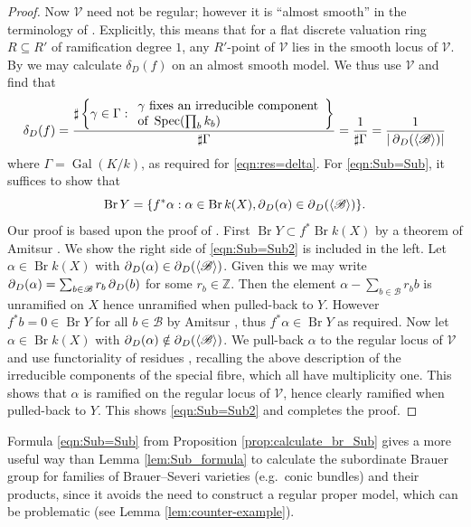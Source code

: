 \documentclass[a4paper,12pt,reqno]{amsart}
\numberwithin{equation}{section} \numberwithin{figure}{section}
\DeclareMathOperator{\Gal}{Gal} \DeclareMathOperator{\NS}{NS}
\DeclareMathOperator{\Spec}{Spec}
\DeclareMathOperator{\Br}{Br} \DeclareMathOperator{\Brnr}{Br_{nr}}
\newcommand\Z{\mathbb{Z}}
\newcommand{\br}{\mathscr{B}}
\renewcommand{\#}{\sharp}
\theoremstyle{definition}
\numberwithin{lemma}{section}
\begin{document}
\begin{proof}
Now $\mathcal{V}$ need not be regular; however it is ``almost smooth'' in the terminology of \cite[Def.~2.1]{Lou18}. Explicitly, this means that for a flat discrete valuation ring $R \subseteq R'$ of ramification degree $1$, any $R'$-point of $\mathcal{V}$ lies in the smooth locus of $\mathcal{V}$. By \cite[Lem.~3.11]{LS16} we may calculate $\delta_D(f)$ on an almost smooth model. We thus use  $\mathcal{V}$ and find that
$$\delta_D(f) = \frac{\# \left\{ \gamma \in \Gamma : 
	\begin{array}{l}
		\gamma \text{ fixes an irreducible component} \\
		\text{of } \Spec(\prod_b k_b)
	\end{array}
	\right \}}
	{\# \Gamma } = \frac{1}{\# \Gamma} = \frac{1}{|\res_D(\langle\br\rangle)|}$$
where $\Gamma = \Gal(K/k)$, as required for \eqref{eqn:res=delta}. For \eqref{eqn:Sub=Sub}, it suffices to show that
\begin{equation} \label{eqn:Sub=Sub2}
	\Br Y = \{ f^*\alpha : \alpha \in \Br k(X), \res_D(\alpha) \in \res_D(\langle\br\rangle) \}.
\end{equation}
Our proof is based upon the proof of \cite[Thm.~2.11]{Lou18}. First $\Br Y \subset f^* \Br k(X)$ by a theorem of Amitsur \cite[Thm.~5.4.1]{GS06}. We show the right side of \eqref{eqn:Sub=Sub2} is included in the left. Let $\alpha \in \Br k(X)$ with $\res_D(\alpha) \in \res_D(\langle\br\rangle)$. Given this we may write $\res_D(\alpha) = \sum_{b \in \br} r_b \res_D(b)$ for some $r_b \in \Z$. Then the element $\alpha - \sum_{b \in \br} r_b b$ is unramified on $X$ hence unramified when pulled-back to $Y$. However $f^*b = 0 \in \Br Y$ for all $b \in \br$ by Amitsur \cite[Thm.~5.4.1]{GS06}, thus $f^*\alpha \in \Br Y$ as required. Now let $\alpha \in \Br k(X)$ with $\res_D(\alpha) \notin \res_D(\langle\br\rangle)$. We pull-back $\alpha$ to the regular locus of $\mathcal{V}$ and use functoriality of residues \cite[Prop.~1.4.6]{Brauer}, recalling the above  description of the irreducible components of the special fibre, which all have multiplicity one. This shows that $\alpha$ is ramified on the regular locus of $\mathcal{V}$, hence clearly ramified when pulled-back to $Y$. This shows \eqref{eqn:Sub=Sub2} and completes the proof.
\end{proof}

Formula \eqref{eqn:Sub=Sub} from Proposition \ref{prop:calculate_br_Sub} gives a more useful way than Lemma \ref{lem:Sub_formula} to calculate the subordinate Brauer group for families of Brauer--Severi varieties (e.g.~conic bundles) and their products, since it avoids the need to construct a regular proper model, which can be problematic  (see Lemma \ref{lem:counter-example}).
\end{document}
